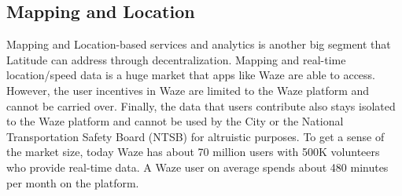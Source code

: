 %
%
%
%
%
%
%
%


\subsection{Mapping and Location}

Mapping and Location-based services and analytics is another big segment that Latitude can address through
decentralization. Mapping and real-time location/speed data is a huge market that apps like Waze are able to access.
However, the user incentives in Waze are limited to the Waze platform and cannot be carried over. Finally, the data that
users contribute also stays isolated to the Waze platform and cannot be used by the City or the National Transportation
Safety Board (NTSB) for altruistic purposes. To get a sense of the market size, today Waze has about 70 million users
with 500K volunteers who provide real-time data. A Waze user on average spends about 480 minutes per month on the
platform.

